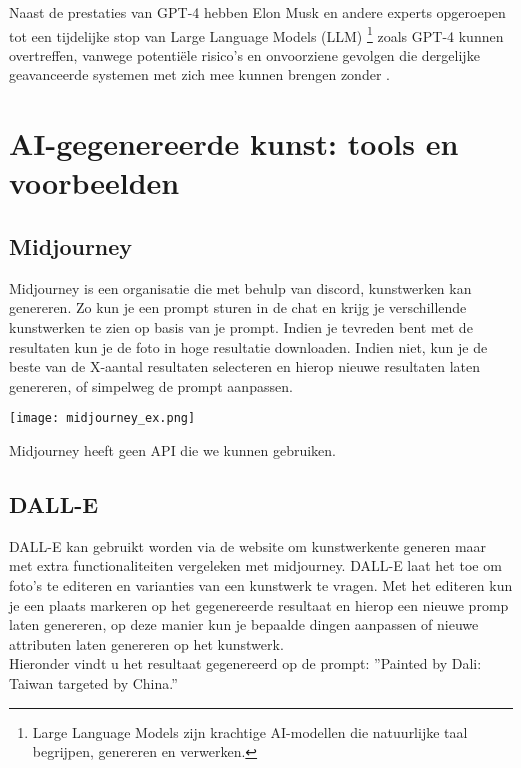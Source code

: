 Naast de prestaties van GPT-4 hebben Elon Musk en andere experts opgeroepen tot een tijdelijke stop van Large Language Models (LLM) \footnote{Large Language Models zijn krachtige AI-modellen die natuurlijke taal begrijpen, genereren en verwerken.} zoals GPT-4 kunnen overtreffen, vanwege potentiële risico's en onvoorziene gevolgen die dergelijke geavanceerde systemen met zich mee kunnen brengen zonder \autocite{reuters_musk}. 
 
\section{AI-gegenereerde kunst: tools en voorbeelden}
\label{sub:tools}
\subsection{ Midjourney}
Midjourney is een organisatie die met behulp van discord, kunstwerken kan genereren. Zo kun je een prompt sturen in de chat en krijg je verschillende kunstwerken te zien op basis van je prompt. Indien je tevreden bent met de resultaten kun je de foto in hoge resultatie downloaden. Indien niet, kun je de beste van de X-aantal resultaten selecteren en hierop nieuwe resultaten laten genereren, of simpelweg de prompt aanpassen. 

\begin{center}
    \texttt{[image: midjourney\_ex.png]}
    \label{fig:midjourney_ex.png}
\end{center}

Midjourney heeft geen API die we kunnen gebruiken.

\subsection{ DALL-E}
DALL-E kan gebruikt worden via de website om kunstwerkente generen maar met extra functionaliteiten vergeleken met midjourney. DALL-E laat het toe om foto's te editeren en varianties van een kunstwerk te vragen. Met het editeren kun je een plaats markeren op het gegenereerde resultaat en hierop een nieuwe promp laten genereren, op deze manier kun je bepaalde dingen aanpassen of nieuwe attributen laten genereren op het kunstwerk. \\

Hieronder vindt u het resultaat gegenereerd op de prompt: ''Painted by Dali: Taiwan targeted by China.'' \\

